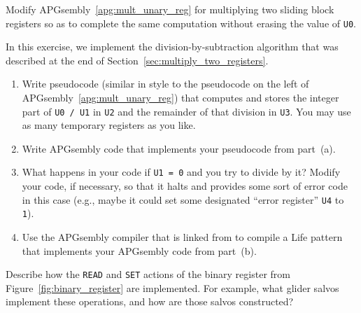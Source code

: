 \begin{multicols}{2}
	
	\begin{problem}\label{exer:universal_computation_mult_preserve_r0} 
		Modify APGsembly~\ref{apg:mult_unary_reg} for multiplying two sliding block registers so as to complete the same computation without erasing the value of \texttt{U0}.
		
	\end{problem}
	
	
	\mfilbreak
	
	
	\begin{problem}\label{exer:division_by_subtraction} 
		In this exercise, we implement the division-by-subtraction algorithm that was described at the end of Section~\ref{sec:multiply_two_registers}.\smallskip
		
		\begin{enumerate}[label=\bf\color{ocre}(\alph*)]
			\item Write pseudocode (similar in style to the pseudocode on the left of APGsembly~\ref{apg:mult_unary_reg}) that computes and stores the integer part of \texttt{U0 / U1} in \texttt{U2} and the remainder of that division in \texttt{U3}. You may use as many temporary registers as you like.
			
			\item Write APGsembly code that implements your pseudocode from part~(a).
			
			\item What happens in your code if \texttt{U1 = 0} and you try to divide by it? Modify your code, if necessary, so that it halts and provides some sort of error code in this case (e.g., maybe it could set some designated ``error register'' \texttt{U4} to \texttt{1}).
			
			\item Use the APGsembly compiler that is linked from  to compile a Life pattern that implements your APGsembly code from part~(b).
		\end{enumerate}
	\end{problem}


	\mfilbreak
	
	
	\begin{problem}\label{exer:describe_binary_register} 
		Describe how the \texttt{READ} and \texttt{SET} actions of the binary register from Figure~\ref{fig:binary_register} are implemented. For example, what glider salvos implement these operations, and how are those salvos constructed?
	\end{problem}
	

\end{multicols}
